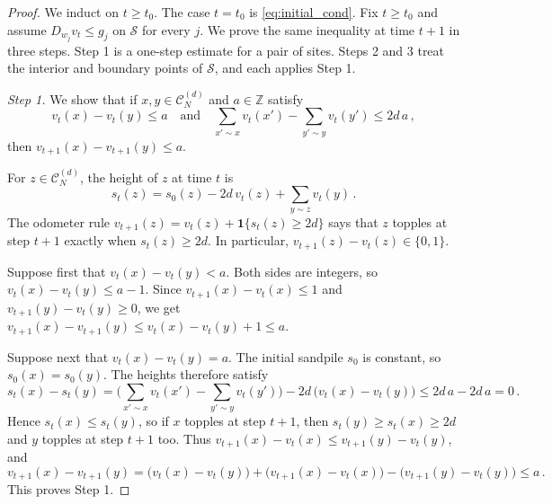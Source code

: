 \documentclass[12pt]{amsart}
\newcommand{\Z}{\mathbb{Z}}
\begin{document}
	\begin{proof}
	We induct on $t\geq t_0$. The case $t=t_0$ is \eqref{eq:initial_cond}. Fix $t\geq t_0$ and assume $D_{w_j}v_t\leq g_j$ on $\mathcal S$ for every $j$. We prove the same inequality at time $t+1$ in three steps. Step 1 is a one-step estimate for a pair of sites. Steps 2 and 3 treat the interior and boundary points of $\mathcal S$, and each applies Step 1.
	
	\emph{Step 1.} We show that if $x,y\in\mathcal C_N^{(d)}$ and $a\in\Z$ satisfy
	\begin{equation*}
	v_t(x)-v_t(y)\leq a
	\quad\mbox{and}\quad
	\sum_{x'\sim x}v_t(x')-\sum_{y'\sim y}v_t(y')\leq 2d\,a\,,
	\end{equation*}
	then $v_{t+1}(x)-v_{t+1}(y)\leq a$.
	
	For $z\in\mathcal C_N^{(d)}$, the height of $z$ at time $t$ is
	\begin{equation*}
	s_t(z)=s_0(z)-2d\,v_t(z)+\sum_{y\sim z}v_t(y)\,.
	\end{equation*}
	The odometer rule $v_{t+1}(z)=v_t(z)+\mathbf{1}\{s_t(z)\geq 2d\}$ says that $z$ topples at step $t+1$ exactly when $s_t(z)\geq 2d$. In particular, $v_{t+1}(z)-v_t(z)\in\{0,1\}$.
	
	Suppose first that $v_t(x)-v_t(y)<a$. Both sides are integers, so $v_t(x)-v_t(y)\leq a-1$. Since $v_{t+1}(x)-v_t(x)\leq 1$ and $v_{t+1}(y)-v_t(y)\geq 0$, we get $v_{t+1}(x)-v_{t+1}(y)\leq v_t(x)-v_t(y)+1\leq a$.
	
	Suppose next that $v_t(x)-v_t(y)=a$. The initial sandpile $s_0$ is constant, so $s_0(x)=s_0(y)$. The heights therefore satisfy
	\begin{equation*}
	s_t(x)-s_t(y)=\Big(\sum_{x'\sim x}v_t(x')-\sum_{y'\sim y}v_t(y')\Big)-2d\,\big(v_t(x)-v_t(y)\big)\leq 2d\,a-2d\,a=0\,.
	\end{equation*}
	Hence $s_t(x)\leq s_t(y)$, so if $x$ topples at step $t+1$, then $s_t(y)\geq s_t(x)\geq 2d$ and $y$ topples at step $t+1$ too. Thus $v_{t+1}(x)-v_t(x)\leq v_{t+1}(y)-v_t(y)$, and
	\begin{equation*}
	v_{t+1}(x)-v_{t+1}(y)=\big(v_t(x)-v_t(y)\big)+\big(v_{t+1}(x)-v_t(x)\big)-\big(v_{t+1}(y)-v_t(y)\big)\leq a\,.
	\end{equation*}
	This proves Step 1.
	

\end{proof}
\end{document}
